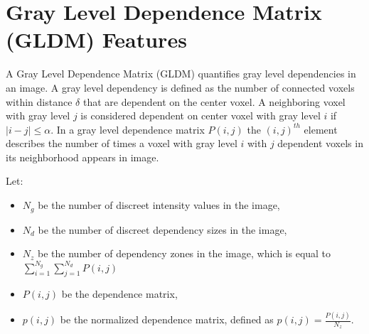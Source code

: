 \section{Gray Level Dependence Matrix (GLDM) Features}
A Gray Level Dependence Matrix (GLDM) quantifies gray level dependencies in an image. A gray level dependency is defined as the number of connected voxels within distance $\delta $ that are dependent on the center voxel. A neighboring voxel with gray level $j$ is considered dependent on center voxel with gray level $i$ if $\left| i-j\right| \leq \alpha $. In a gray level dependence matrix $P\left(i,j\right)$ the $\left(i,j\right)^{th}$ element describes the number of times a voxel with gray level $i$ with $j$ dependent voxels in its neighborhood appears in image.

Let:
\begin{itemize}
\item $N_{g}$ be the number of discreet intensity values in the image, 
\item $N_{d}$ be the number of discreet dependency sizes in the image,
\item $N_{z}$ be the number of dependency zones in the image, which is equal to $\sum _{i=1}^{N_{g}}\sum _{j=1}^{N_{d}}P\left(i,j\right)$
\item $P\left(i,j\right)$ be the dependence matrix,
\item $p\left(i,j\right)$ be the normalized dependence matrix, defined as $p\left(i,j\right)=\frac{P\left(i,j\right)}{N_{z}}$.
\end{itemize}

